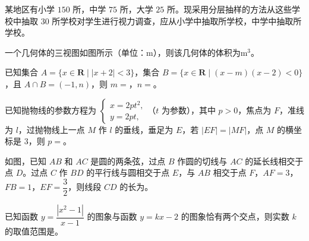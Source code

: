 \begin{question}
某地区有小学 $150$ 所，中学 $75$ 所，大学 $25$ 所。现采用分层抽样的方法从这些学校中抽取 $30$ 所学校对学生进行视力调查，应从小学中抽取\gkblank{}所学校，中学中抽取\gkblank{}所学校。

\Needspace{0.4\textheight}
\end{question}
\begin{question}
一个几何体的三视图如图所示（单位：$\mathrm m$），则该几何体的体积为\gkblank{}$\mathrm m^3$。
\nopagebreak[4]
\begin{center}\end{center}
\nopagebreak[4]
\end{question}
\begin{question}
已知集合 $A=\{x\in\mathbf R\mid|x+2|<3\}$，集合 $B=\{x\in\mathbf R\mid(x-m)(x-2)<0\}$，且 $A\cap B=(-1,n)$，则 $m=$\gkblank{}，$n=$\gkblank{}。

\end{question}
\begin{question}
已知抛物线的参数方程为 $\begin{cases}x=2pt^2,\\y=2pt,\end{cases}$（$t$ 为参数），其中 $p>0$，焦点为 $F$，准线为 $l$，过抛物线上一点 $M$ 作 $l$ 的垂线，垂足为 $E$，若 $|EF|=|MF|$，点 $M$ 的横坐标是 $3$，则 $p=$\gkblank{}。

\Needspace{0.4\textheight}
\end{question}
\begin{question}
如图，已知 $AB$ 和 $AC$ 是圆的两条弦，过点 $B$ 作圆的切线与 $AC$ 的延长线相交于点 $D$。过点 $C$ 作 $BD$ 的平行线与圆相交于点 $E$，与 $AB$ 相交于点 $F$，$AF=3$，$FB=1$，$EF=\dfrac32$，则线段 $CD$ 的长为\gkblank{}。
\nopagebreak[4]
\begin{center}\end{center}
\nopagebreak[4]
\end{question}
\begin{question}
已知函数 $y=\dfrac{|x^2-1|}{x-1}$ 的图象与函数 $y=kx-2$ 的图象恰有两个交点，则实数 $k$ 的取值范围是\gkblank{}。

\end{question}

